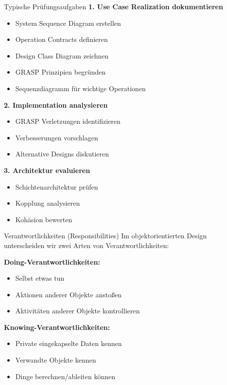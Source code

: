 \begin{KR}{Typische Prüfungsaufgaben}
\textbf{1. Use Case Realization dokumentieren}
\begin{itemize}
    \item System Sequence Diagram erstellen
    \item Operation Contracts definieren
    \item Design Class Diagram zeichnen
    \item GRASP Prinzipien begründen
    \item Sequenzdiagramm für wichtige Operationen
\end{itemize}

\textbf{2. Implementation analysieren}
\begin{itemize}
    \item GRASP Verletzungen identifizieren
    \item Verbesserungen vorschlagen
    \item Alternative Designs diskutieren
\end{itemize}

\textbf{3. Architektur evaluieren}
\begin{itemize}
    \item Schichtenarchitektur prüfen
    \item Kopplung analysieren
    \item Kohäsion bewerten
\end{itemize}
\end{KR}

\begin{definition}{Verantwortlichkeiten (Responsibilities)}
Im objektorientierten Design unterscheiden wir zwei Arten von Verantwortlichkeiten:

\textbf{Doing-Verantwortlichkeiten:}
\begin{itemize}
    \item Selbst etwas tun
    \item Aktionen anderer Objekte anstoßen
    \item Aktivitäten anderer Objekte kontrollieren
\end{itemize}

\textbf{Knowing-Verantwortlichkeiten:}
\begin{itemize}
    \item Private eingekapselte Daten kennen
    \item Verwandte Objekte kennen
    \item Dinge berechnen/ableiten können
\end{itemize}
\end{definition}

